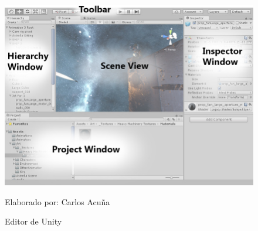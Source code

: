 \documentclass[a4paper, openright, 12pt]{report}
\begin{document}
\begin{figure}[h]
\captionsetup{justification=centering,margin=2cm}
\includegraphics[scale=0.4]{unity01}
\centering
\caption{Editor de Unity}
Elaborado por: Carlos Acuña
\label{fig:unity01}
\end{figure}
\clearpage
\end{document}
